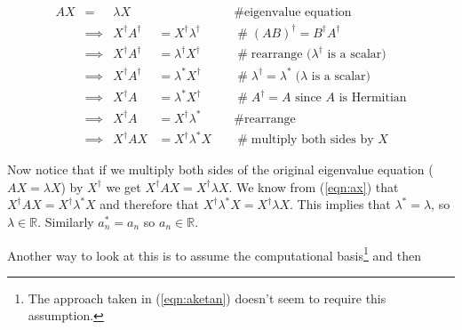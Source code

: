 \documentclass[11pt, oneside]{article}   	%
\begin{document}
\bigskip
\begin{equation}
\begin{array}{lclll}
A X
&=& \lambda X                                                                                              && \quad \mathrel{\#} \text{eigenvalue equation}  \\
&\implies& X^{\dagger} A^\dagger   &= X^{\dagger} \lambda^{\dagger}           & \quad \mathrel{\#} (AB)^\dagger = B^\dagger  A^\dagger \\
&\implies& X^{\dagger} A^\dagger   &= \lambda^{\dagger} X^{\dagger}           & \quad \mathrel{\#} \text{rearrange ($\lambda^\dagger$ is a scalar)} \\
&\implies& X^{\dagger} A^\dagger   &= \lambda^{*} X^{\dagger}                      & \quad \mathrel{\#} \lambda^\dagger = \lambda^* \; \text{($\lambda$ is a scalar)} \\
&\implies& X^{\dagger} A                 &= \lambda^{*} X^{\dagger}                      & \quad \mathrel{\#} A^\dagger = A  \text{ since $A$ is Hermitian} \\
&\implies& X^{\dagger} A                 &= X^{\dagger}   \lambda^{*}                    & \quad \mathrel{\#} \text{rearrange} \\
&\implies& X^\dagger  A X               &= X^{\dagger}  \lambda^{*} X                  & \quad \mathrel{\#} \text{multiply both sides by $X$}
\end{array}
\label{eqn:ax}
\end{equation}

\bigskip
\noindent
Now notice that if we multiply both sides of the original eigenvalue equation ($A X = \lambda X$) by $X^{\dagger}$ we get 
$X^{\dagger} AX = X^{\dagger} \lambda X$.  We know from (\ref{eqn:ax}) that $X^\dagger  A X = X^{\dagger}  \lambda^{*} X$
and therefore that $X^{\dagger}  \lambda^{*} X = X^{\dagger}  \lambda X $.
This implies that $\lambda^{*} = \lambda$, so $\lambda \in \mathbb{R}$.
Similarly $a_n^* = a_n$ so $a_n \in \mathbb{R}$.

\bigskip
\noindent
Another way to look at this is to assume the computational basis\footnote{The approach taken in (\ref{eqn:aketan}) doesn't seem to require this assumption.}
and then
\end{document}
